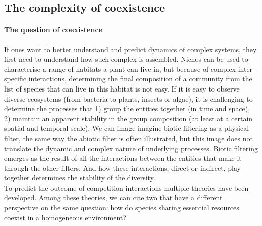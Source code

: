 %
%
%
%
%
%
%

\subsection{The complexity of coexistence}\label{subsection:coexistence}

\paragraph{The question of coexistence}
If ones want to better understand and predict dynamics of complex systems, they first need to understand how such complex is assembled. Niches can be used to characterise a range of habitats a plant can live in, but because of complex inter-specific interactions, determining the final composition of a community from the list of species that can live in this habitat is not easy. If it is easy to observe diverse ecosystems (from bacteria to plants, insects or algae), it is challenging to determine the processes that 1) group the entities together (in time and space), 2) maintain an apparent stability in the group composition (at least at a certain spatial and temporal scale). 
We can image imagine biotic filtering as a physical filter, the same way the abiotic filter is often illustrated, but this image does not translate the dynamic and complex nature of underlying processes. Biotic filtering emerges as the result of all the interactions between the entities that make it through the other filters. And how these interactions, direct or indirect, play together determines the stability of the diversity.\\

To predict the outcome of competition interactions multiple theories have been developed. Among these theories, we can cite two that have a different perspective on the same question: how do species sharing essential resources coexist in a homogeneous environment?

